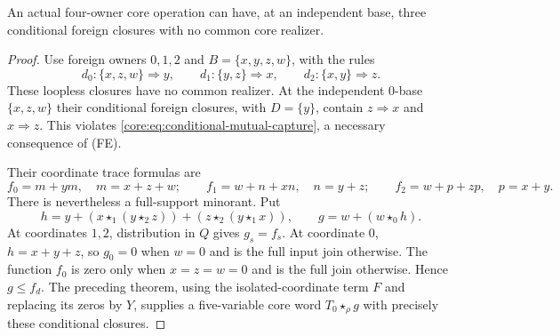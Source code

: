 \begin{proposition}
\label{core:prop:conditional-trace-nonrealizable}
An actual four-owner core operation can have, at an independent base,
three conditional foreign closures with no common core realizer.
\end{proposition}
\begin{proof}
Use foreign owners $0,1,2$ and $B=\{x,y,z,w\}$, with the rules
\[
 d_0:\{x,z,w\}\Rightarrow y,\qquad
 d_1:\{y,z\}\Rightarrow x,\qquad d_2:\{x,y\}\Rightarrow z.
\]
These loopless closures have no common realizer. At the independent
$0$-base $\{x,z,w\}$ their conditional foreign closures, with
$D=\{y\}$, contain $z\Rightarrow x$ and $x\Rightarrow z$.
This violates \eqref{core:eq:conditional-mutual-capture}, a necessary
consequence of (FE).

Their coordinate trace formulas are
\[
 f_0=m+ym,\quad m=x+z+w;\qquad
 f_1=w+n+xn,\quad n=y+z;\qquad
 f_2=w+p+zp,\quad p=x+y.
\]
There is nevertheless a full-support minorant. Put
\[
 h=y+(x\star_1(y\star_2z))+(z\star_2(y\star_1x)),
 \qquad g=w+(w\star_0h).
\]
At coordinates $1,2$, distribution in $Q$ gives $g_s=f_s$.
At coordinate $0$, $h=x+y+z$, so $g_0=0$ when $w=0$ and is the
full input join otherwise. The function $f_0$ is zero only when
$x=z=w=0$ and is the full join otherwise. Hence $g\leq f_d$.
The preceding theorem, using the isolated-coordinate term $F$ and
replacing its zeros by $Y$, supplies a five-variable core word
$T_0\star_\rho g$ with precisely these conditional closures.
\end{proof}

